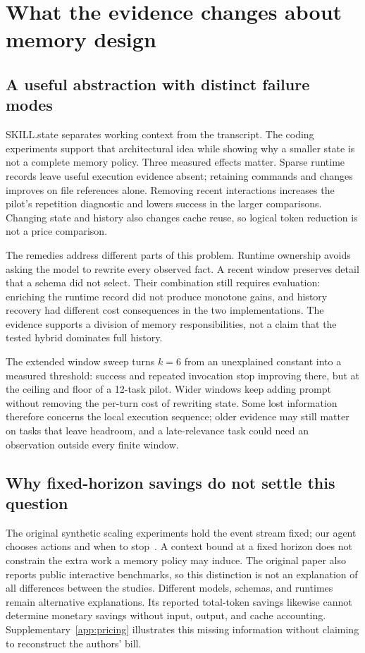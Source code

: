 \section{What the evidence changes about memory design}
\label{sec:discussion}
\subsection{A useful abstraction with distinct failure modes}
SKILL.state separates working context from the transcript. The coding
experiments support that architectural idea while showing why a smaller
state is not a complete memory policy. Three measured effects matter.
Sparse runtime records leave useful execution evidence absent; retaining
commands and changes improves on file references alone. Removing recent
interactions increases the pilot's repetition diagnostic and lowers
success in the larger comparisons. Changing state and history also changes
cache reuse, so logical token reduction is not a price comparison.

The remedies address different parts of this problem. Runtime ownership
avoids asking the model to rewrite every observed fact. A recent window
preserves detail that a schema did not select. Their combination still
requires evaluation: enriching the runtime record did not produce
monotone gains, and history recovery had different cost consequences in
the two implementations. The evidence supports a division of memory
responsibilities, not a claim that the tested hybrid dominates full history.

The extended window sweep turns $k=6$ from an unexplained constant into
a measured threshold: success and repeated invocation stop improving there,
but at the ceiling and floor of a 12-task pilot. Wider windows keep adding
prompt without removing the per-turn cost of rewriting state. Some lost
information therefore concerns the local execution sequence; older
evidence may still matter on tasks that leave headroom, and a
late-relevance task could need an observation outside every finite window.

\subsection{Why fixed-horizon savings do not settle this question}
The original synthetic scaling experiments hold the event stream fixed;
our agent chooses actions and when to stop~\citep{skillstate2026}.
A context bound at a fixed horizon does not constrain the extra work
a memory policy may induce. The original paper also reports public
interactive benchmarks, so this distinction is not an explanation of all
differences between the studies. Different models, schemas, and runtimes
remain alternative explanations. Its reported total-token savings likewise
cannot determine monetary savings without input, output, and cache
accounting. Supplementary~\ref{app:pricing} illustrates this missing
information without claiming to reconstruct the authors' bill.

